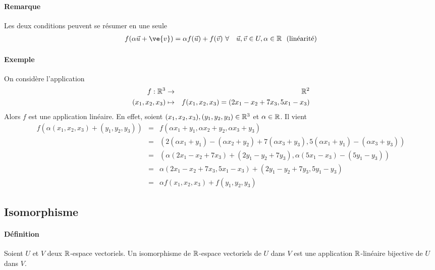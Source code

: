 \paragraph{Remarque} Les deux conditions peuvent se résumer en une seule
  \begin{eqnarray*}
    f(\alpha \vec{u} + \ve{v}) = \alpha f(\vec{u}) + f(\vec{v}) ~ &\forall&\vec{u}, \vec{v} \in U, \alpha \in \R \mbox{~ (linéarité)}
  \end{eqnarray*}

\paragraph{Exemple} On considère l'application 
\begin{eqnarray*}
  f: \mathbb{R}^3 &\rightarrow& \mathbb{R}^2 \\
  (x_1, x_2, x_3) &\mapsto& f(x_1, x_2, x_3) = (2 x_1 - x_2 + 7 x_3, 5 x_1 - x_3)
\end{eqnarray*}
Alors $f$ est une application linéaire. En effet, soient $(x_1, x_2, x_3), (y_1, y_2, y_3) \in \mathbb{R}^3$ et $\alpha \in \mathbb{R}$. Il vient
\begin{eqnarray*}
  f(\alpha (x_1, x_2, x_3) + (y_1, y_2, y_3)) &=& f(\alpha x_1 + y_1, \alpha x_2 + y_2, \alpha x_3 + y_3) \\
    &=& (2 (\alpha x_1 + y_1) - (\alpha x_2 + y_2) + 7 (\alpha x_3 + y_3), 5 (\alpha x_1 + y_1) - (\alpha x_3 + y_3)) \\
    &=& (\alpha (2 x_1 - x_2 + 7 x_3) + (2 y_1 - y_2 + 7 y_3), \alpha(5 x_1 - x_3) - (5 y_1 - y_3)) \\
    &=& \alpha (2 x_1 - x_2 + 7 x_3, 5 x_1 - x_3) + (2 y_1 - y_2 + 7 y_3, 5 y_1 - y_3) \\
    &=& \alpha f(x_1, x_2, x_3) + f(y_1, y_2, y_3)
\end{eqnarray*}


%
\subsection{Isomorphisme}
%
\paragraph{Définition} Soient $U$ et $V$ deux $\mathbb{R}$-espace vectoriels. Un isomorphisme de $\mathbb{R}$-espace vectoriels de $U$ dans $V$ est une application $\mathbb{R}$-linéaire bijective de $U$ dans $V$. 

